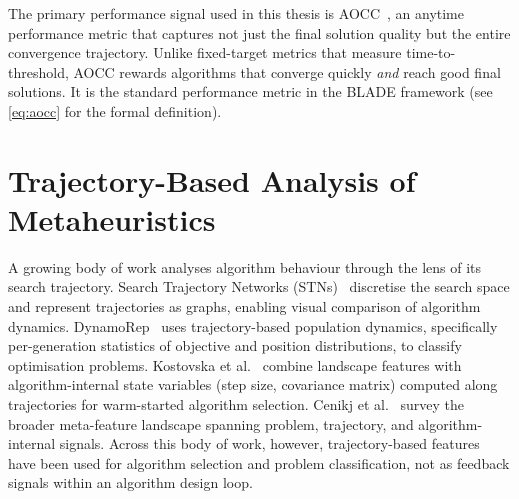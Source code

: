 The primary performance signal used in this thesis is AOCC~\cite{vanStein2024LLaMEA}, an anytime performance metric that captures not just the final solution quality but the entire convergence trajectory. Unlike fixed-target metrics that measure time-to-threshold, AOCC rewards algorithms that converge quickly \emph{and} reach good final solutions. It is the standard performance metric in the BLADE framework (see \cref{eq:aocc} for the formal definition).

\section{Trajectory-Based Analysis of Metaheuristics}
\label{sec:bg-behaviour}

A growing body of work analyses algorithm behaviour through the lens of its search trajectory. Search Trajectory Networks (STNs)~\cite{ochoa2021stn} discretise the search space and represent trajectories as graphs, enabling visual comparison of algorithm dynamics. DynamoRep~\cite{cenikj2023dynamorep} uses trajectory-based population dynamics, specifically per-generation statistics of objective and position distributions, to classify optimisation problems. Kostovska et al.~\cite{kostovska2022trajectory} combine landscape features with algorithm-internal state variables (step size, covariance matrix) computed along trajectories for warm-started algorithm selection. Cenikj et al.~\cite{cenikj2026features} survey the broader meta-feature landscape spanning problem, trajectory, and algorithm-internal signals. Across this body of work, however, trajectory-based features have been used for algorithm selection and problem classification, not as feedback signals within an algorithm design loop.
